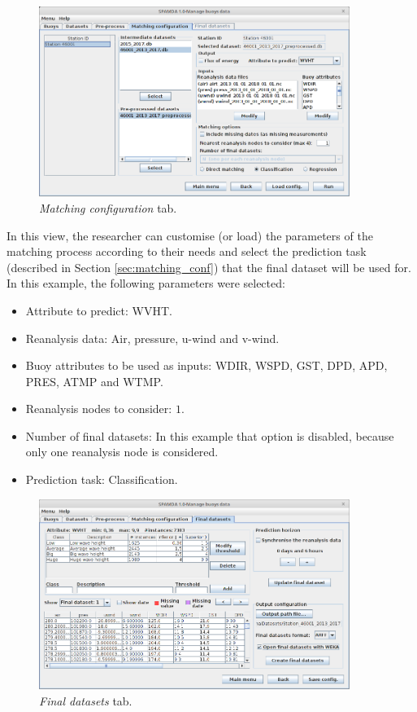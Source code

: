 \documentclass[energies,article,submit,moreauthors,pdftex]{Definitions/mdpi}
\begin{document}
		\begin{figure}[H]
			\centering
			\includegraphics[width=0.90\textwidth]{figures/FigureMatching_configuration.png}
			\caption{\textit{Matching configuration} tab.}\label{fig:matching_conf}
		\end{figure}
		
		In this view, the researcher can customise (or load) the parameters of the matching process according to their needs and select the prediction task  (described in Section \ref{sec:matching_conf}) that the final dataset will be used for. In this example, the following parameters were selected:
		\begin{itemize}[leftmargin=*,labelsep=5.8mm]
			\item Attribute to predict: WVHT.
			\item Reanalysis data: Air, pressure, u-wind and v-wind.
			\item Buoy attributes to be used as inputs: WDIR, WSPD, GST, DPD, APD, PRES, ATMP and WTMP.
			\item Reanalysis nodes to consider: $1$.
			\item Number of final datasets: In this example that option is disabled, because only one reanalysis node is considered.
			\item Prediction task: Classification.
		\end{itemize} 
		
		\begin{figure}[H]
			\centering
			\includegraphics[width=0.90\textwidth]{figures/FigureFinal_datasets.png}
			\caption{\textit{Final datasets} tab.}\label{fig:final_dataset}
		\end{figure}
		
\end{document}
